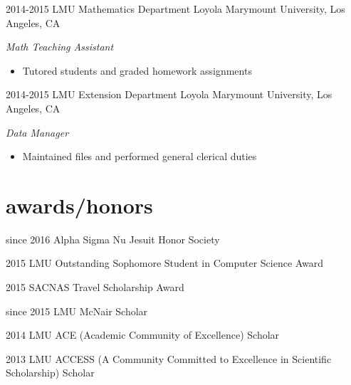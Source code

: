 \documentclass[]{friggeri-cv} %
\begin{document}
\begin{entrylist}

    \entry
      {2014-2015}
      {LMU Mathematics Department}
      {Loyola Marymount University, Los Angeles, CA}
      {\emph{Math Teaching Assistant}
      \begin{itemize}
        \item Tutored students and graded homework assignments
      \end{itemize}}


    \entry
      {2014-2015}
      {LMU Extension Department}
      {Loyola Marymount University, Los Angeles, CA}
      {\emph{Data Manager}
      \begin{itemize}
        \item Maintained files and performed general clerical duties
      \end{itemize}}


\end{entrylist}


\section{awards/honors}

  \begin{entrylist}


    \shortentry
      {since 2016}
      {Alpha Sigma Nu Jesuit Honor Society}


    \shortentry
      {2015}
      {LMU Outstanding Sophomore Student in Computer Science Award}


    \shortentry
      {2015}
      {SACNAS Travel Scholarship Award}


    \shortentry
      {since 2015}
      {LMU McNair Scholar}
      

     \shortentry
      {2014}
      {LMU ACE (Academic Community of Excellence) Scholar}


    \shortentry
      {2013}
      {LMU ACCESS (A Community Committed to Excellence in Scientific Scholarship) Scholar}
      
      
  \end{entrylist}

\end{document}
